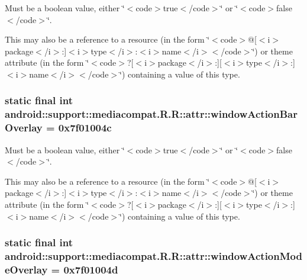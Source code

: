 Must be a boolean value, either \char`\"{}$<$code$>$true$<$/code$>$\char`\"{} or \char`\"{}$<$code$>$false$<$/code$>$\char`\"{}. 

This may also be a reference to a resource (in the form \char`\"{}$<$code$>$@\mbox{[}$<$i$>$package$<$/i$>$:\mbox{]}$<$i$>$type$<$/i$>$:$<$i$>$name$<$/i$>$$<$/code$>$\char`\"{}) or theme attribute (in the form \char`\"{}$<$code$>$?\mbox{[}$<$i$>$package$<$/i$>$:\mbox{]}\mbox{[}$<$i$>$type$<$/i$>$:\mbox{]}$<$i$>$name$<$/i$>$$<$/code$>$\char`\"{}) containing a value of this type. \hypertarget{classandroid_1_1support_1_1mediacompat_1_1_r_1_1attr_f9cd6157c8300671f238d5a2d0a4cd50}{
\subsubsection[{windowActionBarOverlay}]{\setlength{\rightskip}{0pt plus 5cm}static final int android::support::mediacompat.R.R::attr::windowActionBarOverlay = 0x7f01004c}}
\label{classandroid_1_1support_1_1mediacompat_1_1_r_1_1attr_f9cd6157c8300671f238d5a2d0a4cd50}


Must be a boolean value, either \char`\"{}$<$code$>$true$<$/code$>$\char`\"{} or \char`\"{}$<$code$>$false$<$/code$>$\char`\"{}. 

This may also be a reference to a resource (in the form \char`\"{}$<$code$>$@\mbox{[}$<$i$>$package$<$/i$>$:\mbox{]}$<$i$>$type$<$/i$>$:$<$i$>$name$<$/i$>$$<$/code$>$\char`\"{}) or theme attribute (in the form \char`\"{}$<$code$>$?\mbox{[}$<$i$>$package$<$/i$>$:\mbox{]}\mbox{[}$<$i$>$type$<$/i$>$:\mbox{]}$<$i$>$name$<$/i$>$$<$/code$>$\char`\"{}) containing a value of this type. \hypertarget{classandroid_1_1support_1_1mediacompat_1_1_r_1_1attr_8f167ca3378083660cafd9a6f58d53d9}{
\subsubsection[{windowActionModeOverlay}]{\setlength{\rightskip}{0pt plus 5cm}static final int android::support::mediacompat.R.R::attr::windowActionModeOverlay = 0x7f01004d}}
\label{classandroid_1_1support_1_1mediacompat_1_1_r_1_1attr_8f167ca3378083660cafd9a6f58d53d9}


